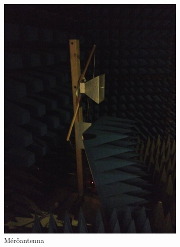 \documentclass[a4paper,12pt,titlepage]{article}
\begin{document}
            \begin{figure}
                \centering
                \begin{subfigure}{0.4\textwidth}
                    \includegraphics[width=\textwidth]{kep/szerkesztett/antennaszoba-antenna.jpg}
                    \caption{Mérőantenna}
                \end{subfigure}
                \begin{subfigure}{0.4\textwidth}

\end{subfigure}
\end{figure}
\end{document}
